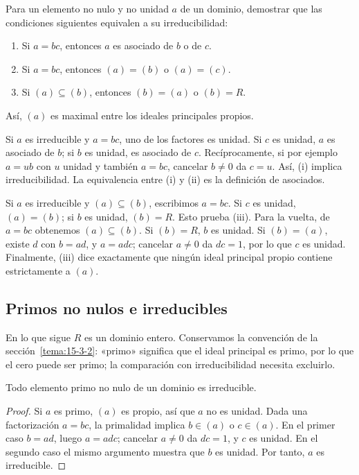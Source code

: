 \begin{ejer}\label{ejer:C15-irreducible}
Para un elemento no nulo y no unidad $a$ de un dominio, demostrar que las condiciones siguientes equivalen a su irreducibilidad:
\begin{enumerate}[label=\textup{(\roman*)}]
\item Si $a=bc$, entonces $a$ es asociado de $b$ o de $c$.
\item Si $a=bc$, entonces $(a)=(b)$ o $(a)=(c)$.
\item Si $(a)\subseteq(b)$, entonces $(b)=(a)$ o $(b)=R$.
\end{enumerate}
Así, $(a)$ es maximal entre los ideales principales propios.
\end{ejer}
\begin{sol}
Si $a$ es irreducible y $a=bc$, uno de los factores es unidad. Si $c$ es unidad, $a$ es asociado de $b$; si $b$ es unidad, es asociado de $c$. Recíprocamente, si por ejemplo $a=ub$ con $u$ unidad y también $a=bc$, cancelar $b\ne0$ da $c=u$. Así, (i) implica irreducibilidad. La equivalencia entre (i) y (ii) es la definición de asociados.

Si $a$ es irreducible y $(a)\subseteq(b)$, escribimos $a=bc$. Si $c$ es unidad, $(a)=(b)$; si $b$ es unidad, $(b)=R$. Esto prueba (iii). Para la vuelta, de $a=bc$ obtenemos $(a)\subseteq(b)$. Si $(b)=R$, $b$ es unidad. Si $(b)=(a)$, existe $d$ con $b=ad$, y $a=adc$; cancelar $a\ne0$ da $dc=1$, por lo que $c$ es unidad. Finalmente, (iii) dice exactamente que ningún ideal principal propio contiene estrictamente a $(a)$.
\end{sol}

\subsection{Primos no nulos e irreducibles}\label{tema:16-1-1}
En lo que sigue $R$ es un dominio entero. Conservamos la convención de la sección~\ref{tema:15-3-2}: «primo» significa que el ideal principal es primo, por lo que el cero puede ser primo; la comparación con irreducibilidad necesita excluirlo.

\begin{lema}\label{lema:C16-primo-irreducible}
Todo elemento primo no nulo de un dominio es irreducible.
\end{lema}
\begin{proof}
Si $a$ es primo, $(a)$ es propio, así que $a$ no es unidad. Dada una factorización $a=bc$, la primalidad implica $b\in(a)$ o $c\in(a)$. En el primer caso $b=ad$, luego $a=adc$; cancelar $a\ne0$ da $dc=1$, y $c$ es unidad. En el segundo caso el mismo argumento muestra que $b$ es unidad. Por tanto, $a$ es irreducible.
\end{proof}

